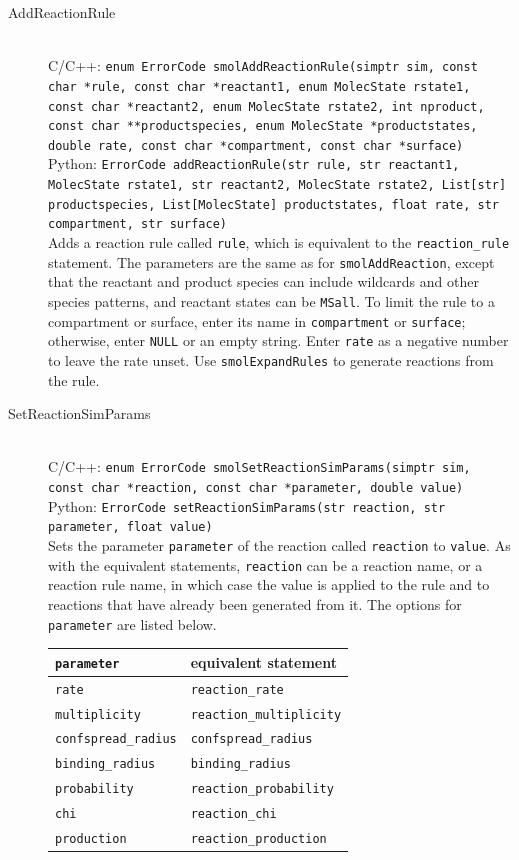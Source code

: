 \documentclass {scrbook}
\newcommand {\ttt} {\texttt}
\begin{document}
\begin{description}
\item[AddReactionRule]
\hfill \\
C/C++: \ttt{enum ErrorCode smolAddReactionRule(simptr sim, const char *rule, const char *reactant1, enum MolecState rstate1, const char *reactant2, enum MolecState rstate2, int nproduct, const char **productspecies, enum MolecState *productstates, double rate, const char *compartment, const char *surface)}\\
Python: \ttt{ErrorCode addReactionRule(str rule, str reactant1, MolecState rstate1, str reactant2, MolecState rstate2, List[str] productspecies, List[MolecState] productstates, float rate, str compartment, str surface)}\\
Adds a reaction rule called \ttt{rule}, which is equivalent to the \ttt{reaction\_rule} statement. The parameters are the same as for \ttt{smolAddReaction}, except that the reactant and product species can include wildcards and other species patterns, and reactant states can be \ttt{MSall}. To limit the rule to a compartment or surface, enter its name in \ttt{compartment} or \ttt{surface}; otherwise, enter \ttt{NULL} or an empty string. Enter \ttt{rate} as a negative number to leave the rate unset. Use \ttt{smolExpandRules} to generate reactions from the rule.

\item[SetReactionSimParams]
\hfill \\
C/C++: \ttt{enum ErrorCode smolSetReactionSimParams(simptr sim, const char *reaction, const char *parameter, double value)}\\
Python: \ttt{ErrorCode setReactionSimParams(str reaction, str parameter, float value)}\\
Sets the parameter \ttt{parameter} of the reaction called \ttt{reaction} to \ttt{value}. As with the equivalent statements, \ttt{reaction} can be a reaction name, or a reaction rule name, in which case the value is applied to the rule and to reactions that have already been generated from it. The options for \ttt{parameter} are listed below.

\begin{longtable}[c]{ll}
\ttt{parameter} & equivalent statement\\
\hline
\ttt{rate} & \ttt{reaction\_rate}\\
\ttt{multiplicity} & \ttt{reaction\_multiplicity}\\
\ttt{confspread\_radius} & \ttt{confspread\_radius}\\
\ttt{binding\_radius} & \ttt{binding\_radius}\\
\ttt{probability} & \ttt{reaction\_probability}\\
\ttt{chi} & \ttt{reaction\_chi}\\
\ttt{production} & \ttt{reaction\_production}\\
\end{longtable}


\end{description}
\end{document}
